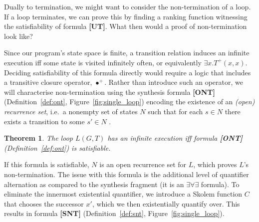 \documentclass[preprint]{sigplanconf}
\newtheorem{theorem}{Theorem}
\theoremstyle{definition}
\begin{document}
Dually to termination, we might want to consider the non-termination of a loop.  If a loop terminates,
we can prove this by finding a ranking function %
witnessing the satisfiability of formula {\bf[UT]}.  What then would a proof of non-termination look like?

Since our program's state space is finite, a transition relation
induces an infinite execution iff some state is visited infinitely
often, or equivalently $ \exists x . T^+(x, x)$.
Deciding satisfiability of this formula directly would require a logic
that includes a transitive closure operator, $\bullet^+$.  Rather than
introduce such an operator, we will characterise non-termination
using the synthesis formula {\bf [ONT]} (Definition~\ref{def:ont}, Figure~\ref{fig:single_loop})
encoding the existence of an \emph{(open) recurrence set}, i.e.~a nonempty 
set of states $N$ such that for each $s \in N$ there
exists a transition to some $s' \in N$ \cite{DBLP:conf/popl/GuptaHMRX08}.

\begin{theorem}
\label{thm:ont}
 The loop $L(G, T)$ has an infinite execution iff formula {\bf [ONT]} (Definition~\ref{def:ont}) is satisfiable.
\end{theorem}

%  

If this formula is satisfiable, $N$ is an open recurrence set for $L$, which proves
$L$'s non-termination. The issue with this formula is the additional level of quantifier alternation as compared to the synthesis fragment
(it is an $\exists \forall \exists$ formula).  To eliminate the innermost existential quantifier,
we introduce a Skolem function $C$ that chooses the successor $x'$, which we then existentially quantify over.  This results in
formula {\bf [SNT]} (Definition~\ref{def:snt}, Figure~\ref{fig:single_loop}).
\end{document}
